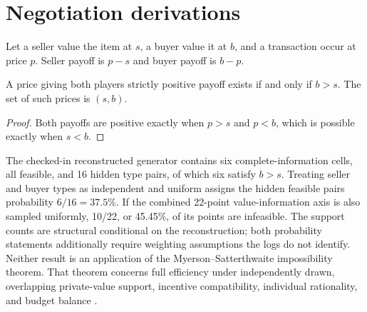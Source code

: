 \section{Negotiation derivations}
\label{app:negotiation}

Let a seller value the item at $s$, a buyer value it at $b$, and a transaction
occur at price $p$. Seller payoff is $p-s$ and buyer payoff is $b-p$.

\begin{proposition}
A price giving both players strictly positive payoff exists if and only if
$b>s$. The set of such prices is $(s,b)$.
\end{proposition}
\begin{proof}
Both payoffs are positive exactly when $p>s$ and $p<b$, which is possible
exactly when $s<b$.
\end{proof}

The checked-in reconstructed generator contains six complete-information cells,
all feasible, and 16 hidden type pairs, of which six satisfy $b>s$. Treating
seller and buyer types as independent and uniform assigns the hidden feasible
pairs probability $6/16=37.5\%$. If the combined 22-point value-information
axis is also sampled uniformly, 10/22, or 45.45\%, of its points are infeasible.
The support counts are structural conditional on the reconstruction; both
probability statements additionally require weighting assumptions the logs do
not identify. Neither result is an application of the
Myerson--Satterthwaite impossibility theorem. That theorem concerns full
efficiency under independently drawn, overlapping private-value support,
incentive compatibility, individual rationality, and budget balance
\citep{myerson1983bilateral}.

